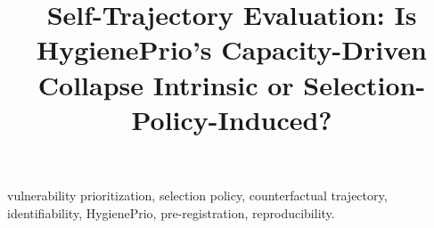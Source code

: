 \documentclass[journal]{IEEEtran}
\title{Self-Trajectory Evaluation: Is HygienePrio's Capacity-Driven
Collapse Intrinsic or Selection-Policy-Induced?}
\author{%
  \IEEEauthorblockN{Harshavardhan Malla}
  \IEEEauthorblockA{Independent Researcher}%
}
\begin{document}
\maketitle

\begin{abstract}

\end{abstract}

\begin{IEEEkeywords}
vulnerability prioritization, selection policy, counterfactual trajectory,
identifiability, HygienePrio, pre-registration, reproducibility.
\end{IEEEkeywords}













\end{document}
